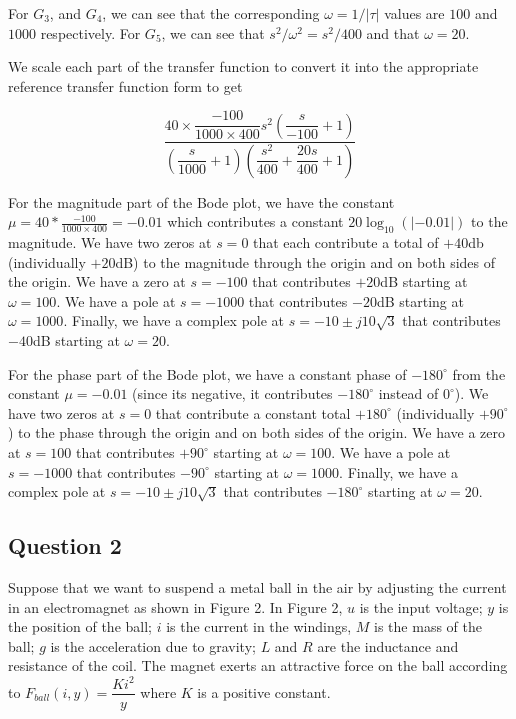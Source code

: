 \documentclass[11pt]{article}
\begin{document}
For $G_3$, and $G_4$, we can see that the corresponding $\omega = 1/|\tau|$ values are $100$ and $1000$ respectively. For $G_5$, we can see that $s^2 / \omega^2 = s^2 / 400$ and that $\omega = 20$.

We scale each part of the transfer function to convert it into the appropriate reference transfer function form to get

\[ \dfrac{ 40 \times \dfrac{-100}{1000 \times 400} s^2 \left( \dfrac{s}{-100} + 1 \right)}{\left( \dfrac{s}{1000} + 1 \right) \left( \dfrac{s^2}{400} + \dfrac{20s}{400} + 1 \right)} \]

For the magnitude part of the Bode plot, we have the constant $\mu = 40 * \frac{-100}{1000 \times 400} = -0.01$ which contributes a constant $20 \log_{10}(| -0.01 |)$ to the magnitude. We have two zeros at $s = 0$ that each contribute a total of $+40$db (individually $+20$dB) to the magnitude through the origin and on both sides of the origin. We have a zero at $s = -100$ that contributes $+20$dB starting at $\omega = 100$. We have a pole at $s = -1000$ that contributes $-20$dB starting at $\omega = 1000$. Finally, we have a complex pole at $s = -10 \pm j 10 \sqrt{3}$ that contributes $-40$dB starting at $\omega = 20$.

For the phase part of the Bode plot, we have a constant phase of $-180^\circ$ from the constant $\mu = -0.01$ (since its negative, it contributes $-180^\circ$ instead of $0^\circ$). We have two zeros at $s = 0$ that contribute a constant total $+180^\circ$ (individually $+90^\circ$) to the phase through the origin and on both sides of the origin. We have a zero at $s = 100$ that contributes $+90^\circ$ starting at $\omega = 100$. We have a pole at $s = -1000$ that contributes $-90^\circ$ starting at $\omega = 1000$. Finally, we have a complex pole at $s = -10 \pm j 10 \sqrt{3}$ that contributes $-180^\circ$ starting at $\omega = 20$.

\subsection{Question 2}

Suppose that we want to suspend a metal ball in the air by adjusting the current in an electromagnet as shown in Figure 2. In Figure 2, $u$ is the input voltage; $y$ is the position of the ball; $i$ is the current in the windings, $M$ is the mass of the ball; $g$ is the acceleration due to gravity; $L$ and $R$ are the inductance and resistance of the coil. The magnet exerts an attractive force on the ball according to $F_{ball}(i, y) = \dfrac{Ki^2}{y}$ where $K$ is  a positive constant.
\end{document}
